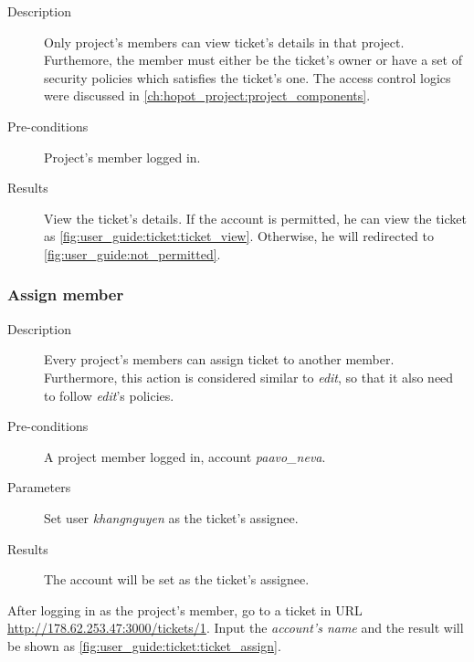 \begin{description}
\item[Description] Only project's members can view ticket's details in that project.
Furthemore, the member must either be the ticket's owner or have a set of security policies which satisfies the ticket's one.
The access control logics were discussed in \autoref{ch:hopot_project:project_components}.
\item[Pre-conditions] Project's member logged in.
\item[Results] View the ticket's details.
If the account is permitted, he can view the ticket as \autoref{fig:user_guide:ticket:ticket_view}.
Otherwise, he will redirected to \autoref{fig:user_guide:not_permitted}.
\end{description}

\subsubsection{Assign member}
\label{ch:result:user_guide:ticket:managing_member}

\begin{description}
\item[Description] Every project's members can assign ticket to another member.
Furthermore, this action is considered similar to \emph{edit}, so that it also need to follow \emph{edit}'s policies.
\item[Pre-conditions] A project member logged in, \eg account \emph{paavo\_neva}.
\item[Parameters] Set user \emph{khangnguyen} as the ticket's assignee.
\item[Results] The account will be set as the ticket's assignee.
\end{description}

After logging in as the project's member, go to a ticket in URL \href{http://178.62.253.47:3000/tickets/1}{http://178.62.253.47:3000/tickets/1}.
Input the \emph{account's name} and the result will be shown as \autoref{fig:user_guide:ticket:ticket_assign}.

